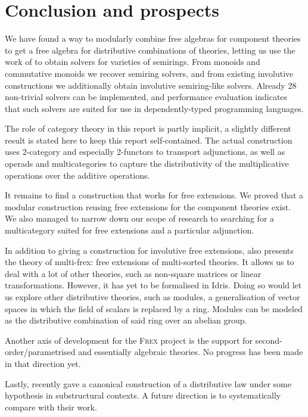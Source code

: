
\section{Conclusion and prospects}
\label{sec:conclusion}

We have found a way to modularly combine free algebras for component theories to get a free algebra for distributive combinations of theories, letting us use the work of \textcite{idris_frex} to obtain solvers for varieties of semirings. From monoids and commutative monoids we recover semiring solvers, and from existing involutive constructions we additionally obtain involutive semiring-like solvers. Already 28 non-trivial solvers can be implemented, and performance evaluation indicates that such solvers are suited for use in dependently-typed programming languages.

The role of category theory in this report is partly implicit, a slightly different result is stated here to keep this report self-contained. The actual construction uses 2-category and especially 2-functors to transport adjunctions, as well as operads and multicategories to capture the distributivity of the multiplicative operations over the additive operations.

It remains to find a construction that works for free extensions. We proved that a modular construction reusing free extensions for the component theories exist. We also managed to narrow down our scope of research to searching for a multicategory suited for free extensions and a particular adjunction.

In addition to giving a construction for involutive free extensions, \textcite{involutive_frex} also presents the theory of multi-frex: free extensions of multi-sorted theories. It allows us to deal with a lot of other theories, such as non-square matrices or linear transformations. However, it has yet to be formalised in Idris. Doing so would let us explore other distributive theories, such as modules, a generalisation of vector spaces in which the field of scalars is replaced by a ring. Modules can be modeled as the distributive combination of said ring over an abelian group.

Another axis of development for the \textsc{Frex} project is the support for second-order/parametrised and essentially algebraic theories. No progress has been made in that direction yet.

Lastly, \textcite{monad_dist_law} recently gave a canonical construction of a distributive law under some hypothesis in substructural contexts. A future direction is to systematically compare with their work.

